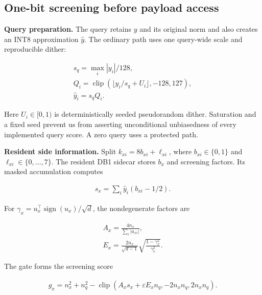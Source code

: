 \subsection{One-bit screening before payload access}

\textbf{Query preparation.} The query retains $y$ and its original norm and also creates an INT8 approximation $\widehat y$. The ordinary path uses one query-wide scale and reproducible dither:

\begin{equation}
\begin{gathered}
s_q=\max_i|y_i|/128,\\
Q_i=\operatorname{clip}(\lfloor y_i/s_q+U_i\rfloor,-128,127),\\
\widehat y_i=s_qQ_i.
\end{gathered}
\end{equation}

Here $U_i\in[0,1)$ is deterministically seeded pseudorandom dither. Saturation and a fixed seed prevent us from asserting unconditional unbiasedness of every implemented query score. A zero query uses a protected path.

\textbf{Resident side information.} Split $k_{xi}=8b_{xi}+\ell_{xi}$, where $b_{xi}\in\{0,1\}$ and $\ell_{xi}\in\{0,\ldots,7\}$. The resident DB1 sidecar stores $b_x$ and screening factors. Its masked accumulation computes

\begin{equation}
\begin{gathered}
s_x=\sum_i\widehat y_i(b_{xi}-1/2).
\end{gathered}
\end{equation}

For $\gamma_x=u_x^\top\operatorname{sign}(u_x)/\sqrt d$, the nondegenerate factors are

\begin{equation}
\begin{gathered}
A_x=\frac{4n_x}{\sum_i|u_{xi}|},\\
E_x=\frac{2n_x}{\sqrt{d-1}}\sqrt{\frac{1-\gamma_x^2}{\gamma_x^2}}.
\end{gathered}
\end{equation}

The gate forms the screening score

\begin{equation}
\begin{gathered}
g_x=n_x^2+n_q^2-\operatorname{clip}(A_xs_x+\varepsilon E_xn_q,-2n_xn_q,2n_xn_q).
\end{gathered}
\end{equation}

